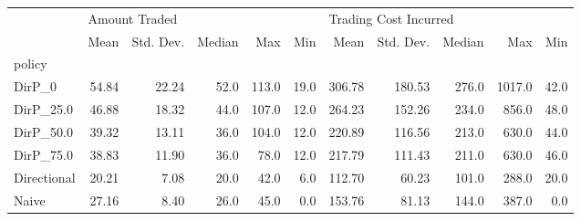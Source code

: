 \begin{tabular}{lrrrrrrrrrr}
\toprule
{} & \multicolumn{5}{l}{Amount Traded} & \multicolumn{5}{l}{Trading Cost Incurred} \\
{} &          Mean & Std. Dev. & Median &    Max &   Min &                  Mean & Std. Dev. & Median &     Max &   Min \\
policy      &               &           &        &        &       &                       &           &        &         &       \\
\midrule
DirP\_0      &         54.84 &     22.24 &   52.0 &  113.0 &  19.0 &                306.78 &    180.53 &  276.0 &  1017.0 &  42.0 \\
DirP\_25.0   &         46.88 &     18.32 &   44.0 &  107.0 &  12.0 &                264.23 &    152.26 &  234.0 &   856.0 &  48.0 \\
DirP\_50.0   &         39.32 &     13.11 &   36.0 &  104.0 &  12.0 &                220.89 &    116.56 &  213.0 &   630.0 &  44.0 \\
DirP\_75.0   &         38.83 &     11.90 &   36.0 &   78.0 &  12.0 &                217.79 &    111.43 &  211.0 &   630.0 &  46.0 \\
Directional &         20.21 &      7.08 &   20.0 &   42.0 &   6.0 &                112.70 &     60.23 &  101.0 &   288.0 &  20.0 \\
Naive       &         27.16 &      8.40 &   26.0 &   45.0 &   0.0 &                153.76 &     81.13 &  144.0 &   387.0 &   0.0 \\
\bottomrule
\end{tabular}
